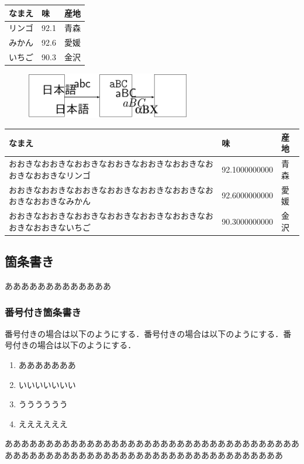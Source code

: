 \begin{multicols*}{2}
\begin{table} %
	\centering
	\begin{tabular}{|l|l|l|}
		\hline
			なまえ & 味 & 産地\\
		\hline
				リンゴ & 92.1 & 青森\\
				みかん & 92.6 & 愛媛\\
				いちご & 90.3 & 金沢\\
		\hline
	\end{tabular}
\end{table}

\begin{figure} %
	\centering
	\includegraphics[height=2cm,width=\linewidth]{fig/concept.pdf}
\end{figure}

\begin{table} %
	\centering
{}
	\begin{tabular}{|l|l|l|}
		\hline
			なまえ & 味 & 産地\\
		\hline
			おおきなおおきなおおきなおおきなおおきなおおきなおおきなおおきなリンゴ & 92.1000000000 & 青森\\
			おおきなおおきなおおきなおおきなおおきなおおきなおおきなおおきなみかん & 92.6000000000 & 愛媛\\
			おおきなおおきなおおきなおおきなおおきなおおきなおおきなおおきないちご & 90.3000000000 & 金沢\\
		\hline
	\end{tabular}
\end{table}


\subsection{箇条書き}
あああああああああああああ
\subsubsection{番号付き箇条書き}
番号付きの場合は以下のようにする．番号付きの場合は以下のようにする．番号付きの場合は以下のようにする．
\begin{enumerate}
 \item あああああああ
\item いいいいいいい
\item うううううう
\item ええええええ
\end{enumerate}
ああああああああああああああああああああああああああああああああああああああああああああああああああああああああああああああああああああああ

\end{multicols*}
